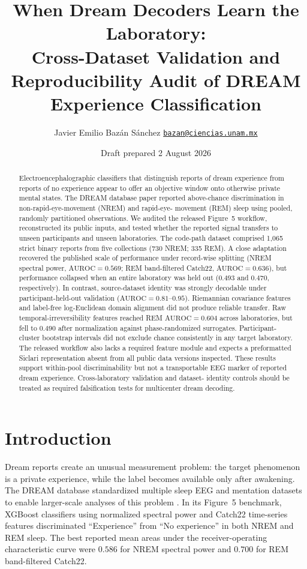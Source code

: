 \documentclass[10pt,twocolumn]{article}
\title{When Dream Decoders Learn the Laboratory:\\
Cross-Dataset Validation and Reproducibility Audit of DREAM Experience Classification}
\author{Javier Emilio Baz\'an S\'anchez \quad
\normalsize\href{mailto:bazan@ciencias.unam.mx}{\texttt{bazan@ciencias.unam.mx}}}
\date{Draft prepared 2 August 2026}
\newcommand{\AUC}{\mathrm{AUROC}}
\begin{document}
\maketitle

\begin{abstract}
Electroencephalographic classifiers that distinguish reports of dream
experience from reports of no experience appear to offer an objective window
onto otherwise private mental states. The DREAM database paper reported
above-chance discrimination in non-rapid-eye-movement (NREM) and rapid-eye-
movement (REM) sleep using pooled, randomly partitioned observations. We
audited the released Figure~5 workflow, reconstructed its public inputs, and
tested whether the reported signal transfers to unseen participants and unseen
laboratories. The code-path dataset comprised 1,065 strict binary reports from
five collections (730 NREM; 335 REM). A close adaptation recovered the
published scale of performance under record-wise splitting (NREM spectral
power, $\AUC=0.569$; REM band-filtered Catch22, $\AUC=0.636$), but performance
collapsed when an entire laboratory was held out ($0.493$ and $0.470$,
respectively). In contrast, source-dataset identity was strongly decodable
under participant-held-out validation ($\AUC=0.81$--$0.95$). Riemannian
covariance features and label-free log-Euclidean domain alignment did not
produce reliable transfer. Raw temporal-irreversibility features reached REM
$\AUC=0.604$ across laboratories, but fell to $0.490$ after normalization
against phase-randomized surrogates. Participant-cluster bootstrap intervals
did not exclude chance consistently in any target laboratory. The released
workflow also lacks a required feature module and expects a preformatted
Siclari representation absent from all public data versions inspected. These
results support within-pool discriminability but not a transportable EEG
marker of reported dream experience. Cross-laboratory validation and dataset-
identity controls should be treated as required falsification tests for
multicenter dream decoding.
\end{abstract}

\section{Introduction}

Dream reports create an unusual measurement problem: the target phenomenon is
a private experience, while the label becomes available only after awakening.
The DREAM database standardized multiple sleep EEG and mentation datasets to
enable larger-scale analyses of this problem \citep{wong2025dream}. In its
Figure~5 benchmark, XGBoost classifiers using normalized spectral power and
Catch22 time-series features discriminated ``Experience'' from ``No
experience'' in both NREM and REM sleep. The best reported mean areas under the
receiver-operating characteristic curve were $0.586$ for NREM spectral power
and $0.700$ for REM band-filtered Catch22.
\end{document}
